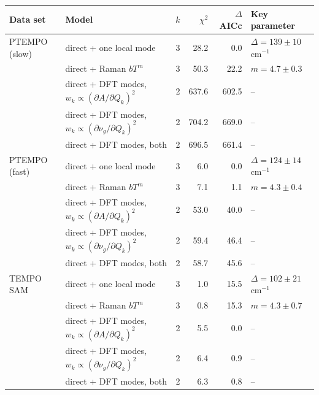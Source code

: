 \begin{tabular}{llrrrl}
\toprule
Data set & Model & $k$ & $\chi^2$ & $\Delta$AICc & Key parameter\\
\midrule
PTEMPO (slow) & direct + one local mode & 3 & 28.2 & 0.0 & $\Delta = 139\pm10$ cm$^{-1}$\\
 & direct + Raman $bT^m$ & 3 & 50.3 & 22.2 & $m = 4.7\pm0.3$\\
 & direct + DFT modes, $w_k\propto(\partial A/\partial Q_k)^2$ & 2 & 637.6 & 602.5 & --\\
 & direct + DFT modes, $w_k\propto(\partial\nu_g/\partial Q_k)^2$ & 2 & 704.2 & 669.0 & --\\
 & direct + DFT modes, both & 2 & 696.5 & 661.4 & --\\
\midrule
PTEMPO (fast) & direct + one local mode & 3 & 6.0 & 0.0 & $\Delta = 124\pm14$ cm$^{-1}$\\
 & direct + Raman $bT^m$ & 3 & 7.1 & 1.1 & $m = 4.3\pm0.4$\\
 & direct + DFT modes, $w_k\propto(\partial A/\partial Q_k)^2$ & 2 & 53.0 & 40.0 & --\\
 & direct + DFT modes, $w_k\propto(\partial\nu_g/\partial Q_k)^2$ & 2 & 59.4 & 46.4 & --\\
 & direct + DFT modes, both & 2 & 58.7 & 45.6 & --\\
\midrule
TEMPO SAM & direct + one local mode & 3 & 1.0 & 15.5 & $\Delta = 102\pm21$ cm$^{-1}$\\
 & direct + Raman $bT^m$ & 3 & 0.8 & 15.3 & $m = 4.3\pm0.7$\\
 & direct + DFT modes, $w_k\propto(\partial A/\partial Q_k)^2$ & 2 & 5.5 & 0.0 & --\\
 & direct + DFT modes, $w_k\propto(\partial\nu_g/\partial Q_k)^2$ & 2 & 6.4 & 0.9 & --\\
 & direct + DFT modes, both & 2 & 6.3 & 0.8 & --\\
\bottomrule
\end{tabular}
